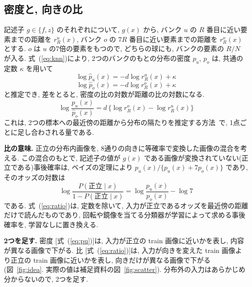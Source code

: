 \documentclass[MIRU,submit]{miru2025j}
\renewcommand{\eqref}[1]{(\ref{#1})}
\begin{document}
\subsection{密度と, 向きの比}
記述子 $g\in\{f,z\}$ のそれぞれについて, $g(x)$ から, バンク $u$ の $R$ 番目に近い要素までの距離を $r^{u}_{R}(x)$, バンク $o$ の $7R$ 番目に近い要素までの距離を $r^{o}_{R}(x)$ とする. $o$ は $u$ の7倍の要素をもつので, どちらの球にも, バンクの要素の $R/N$ が入る. 式~\eqref{eq:knn}により, 2つのバンクのもとの分布の密度 $p_u$, $p_o$ は, 共通の定数 $\kappa$ を用いて
\begin{equation}
\log\hat{p}_u(x)=-d\log r^{u}_{R}(x)+\kappa
\label{eq:pu}
\end{equation}
\begin{equation}
\log\hat{p}_o(x)=-d\log r^{o}_{R}(x)+\kappa
\label{eq:po}
\end{equation}
と推定でき, 差をとると, 密度の比の対数が距離の比の対数になる.
\begin{equation}
\log\frac{\hat{p}_u(x)}{\hat{p}_o(x)}=d\,\bigl\{\log r^{o}_{R}(x)-\log r^{u}_{R}(x)\bigr\}
\label{eq:ratio}
\end{equation}
これは, 2つの標本への最近傍の距離から分布の隔たりを推定する方法~\cite{wang2009divergence}で, 1点ごとに足し合わされる量である.

\textbf{比の意味.} 正立の分布内画像を, 8通りの向きに等確率で変換した画像の混合を考える. この混合のもとで, 記述子の値が $g(x)$ である画像が変換されていない(正立である)事後確率は, ベイズの定理により $p_u(x)/\{p_u(x)+7p_o(x)\}$ であり, そのオッズの対数は
\begin{equation}
\log\frac{P(\text{正立}\mid x)}{1-P(\text{正立}\mid x)}=\log\frac{p_u(x)}{p_o(x)}-\log 7
\label{eq:odds}
\end{equation}
である. 式~\eqref{eq:ratio}は, 定数を除いて, 入力が正立であるオッズを最近傍の距離だけで読んだものであり, 回転や鏡像を当てる分類器が学習によって求める事後確率を, 学習なしに置き換える.

\textbf{2つを足す.} 密度 [式~\eqref{eq:pu}]は, 入力が正立の train 画像に近いかを表し, 内容が異なる画像で下がる. 比 [式~\eqref{eq:ratio}]は, 入力が向きを変えた train 画像より正立の train 画像に近いかを表し, 向きだけが異なる画像で下がる(図~\ref{fig:idea}. 実際の値は補足資料の図~\ref{fig:scatter}). 分布外の入力はあらかじめ分からないので, 2つを足す.
\end{document}
